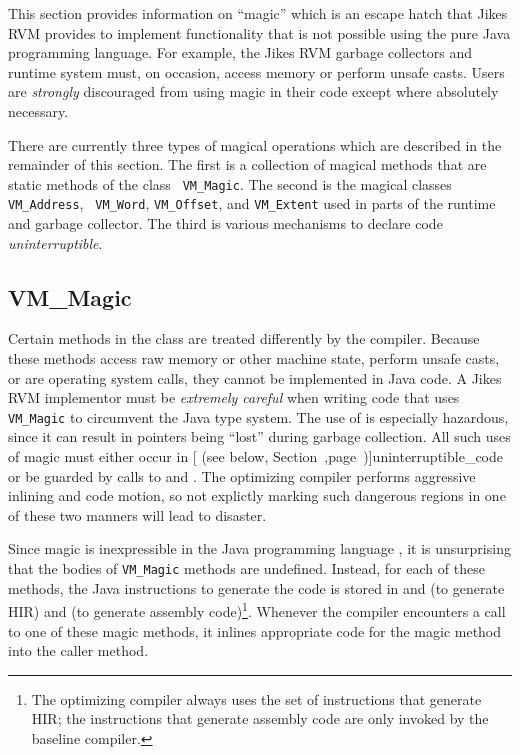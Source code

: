 This section provides information on ``magic'' which is an escape
hatch that Jikes\TMweb{} RVM provides to implement
functionality that is not 
possible using the pure Java\TMweb{} programming language.  For example, the Jikes RVM garbage
collectors and 
runtime system must, on occasion, access memory or perform unsafe
casts.  Users are {\it strongly} discouraged from using magic in their code
except where absolutely necessary.  

There are currently three types of magical operations which are
described in the remainder of this section.  The first is a collection
of magical methods that are static methods of the class {\tt
VM\_Magic}.  The second is the magical classes {\tt VM\_Address}, {\tt
VM\_Word}, {\tt VM\_Offset}, and  {\tt VM\_Extent} used in
parts of the runtime and garbage collector. The third is various
mechanisms to declare code {\em uninterruptible}.

\subsection{VM\_Magic}
Certain methods in the class  are
treated differently by the compiler. Because these methods access raw
memory or other machine state, perform unsafe casts, or are operating
system calls, they cannot be implemented in Java code.  A
Jikes\TMweb{} RVM implementor must be {\em extremely careful} when
writing code that uses {\tt VM\_Magic} to circumvent the Java type
system.  The use of  is especially hazardous, since it can
result in pointers being ``lost'' during garbage collection.  All such
uses of magic must either occur in [
(see below, Section~\Ref,page~\Pageref)]{uninterruptible_code}
or be guarded by calls to  and .
The optimizing compiler performs aggressive inlining and code motion, so
not explictly marking such dangerous regions in one of these two
manners will lead to disaster.

Since magic is inexpressible in the Java programming language , it is
unsurprising that the bodies of {\tt VM\_Magic} methods are undefined.
Instead, for each of these methods, the Java instructions to generate
the code is stored in
 and 
 (to generate HIR) and 
 (to generate assembly code)\footnote{The optimizing
compiler always uses the set of instructions that generate HIR; the
instructions that generate assembly code are only invoked by the
baseline compiler.}.  Whenever the compiler encounters a call to one of these
magic methods, it inlines appropriate code for the magic method into the caller method.

